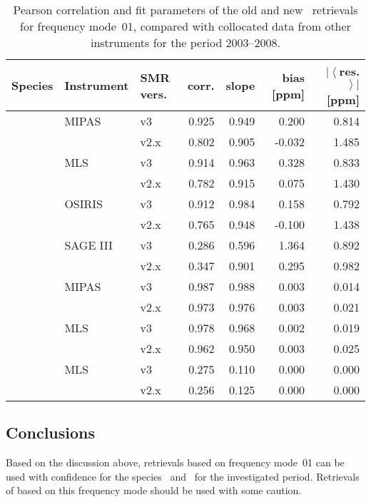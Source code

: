 \begin{table}[hbt]
\centering
\caption{Pearson correlation and fit parameters of the old and new \smr\
retrievals for frequency mode~01, compared with collocated data from other
instruments for the period 2003--2008.
}
\label{tab:fm01:stats}
\begin{tabular}{lllrrrr}
    \toprule
    \textbf{Species} & \textbf{Instrument} & \textbf{SMR vers.} & \textbf{corr.} & \textbf{slope} & \textbf{bias [ppm]} & \textbf{$\left|\left<\right.\right.$res.$\left.\left.\right>\right|$ [ppm]} \\
    \midrule
    \chem{O3}   & MIPAS     & v3    & 0.925 & 0.949 & 0.200     & 0.814 \\
                &           & v2.x  & 0.802 & 0.905 & -0.032    & 1.485 \\
    \cline{2-7}
                & MLS       & v3    & 0.914 & 0.963 & 0.328     & 0.833 \\
                &           & v2.x  & 0.782 & 0.915 & 0.075     & 1.430 \\
    \cline{2-7}
                & OSIRIS    & v3    & 0.912 & 0.984 & 0.158     & 0.792 \\
                &           & v2.x  & 0.765 & 0.948 & -0.100    & 1.438 \\
    \cline{2-7}
                & SAGE III  & v3    & 0.286 & 0.596 & 1.364     & 0.892 \\
                &           & v2.x  & 0.347 & 0.901 & 0.295     & 0.982 \\
    \midrule
    \chem{N_2O} & MIPAS     & v3    & 0.987 & 0.988 & 0.003     & 0.014 \\
                &           & v2.x  & 0.973 & 0.976 & 0.003     & 0.021 \\
    \cline{2-7}
                & MLS       & v3    & 0.978 & 0.968 & 0.002     & 0.019 \\
                &           & v2.x  & 0.962 & 0.950 & 0.003     & 0.025 \\
    \midrule
    \chem{ClO}  & MLS       & v3    & 0.275 & 0.110 & 0.000     & 0.000 \\
                &           & v2.x  & 0.256 & 0.125 & 0.000     & 0.000 \\
    \bottomrule
\end{tabular}
\end{table}

\subsection{Conclusions}
\label{sec:fm01:conclusions}
Based on the discussion above, retrievals based on frequency mode~01 can be
used with confidence for the species~\chem{O_3} and~\chem{N_2O} for the
investigated period. Retrievals of \chem{ClO} based on this frequency mode
should be used with some caution.
